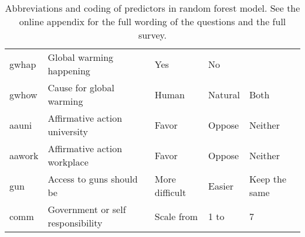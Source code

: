 \begin{table}[ht]
\begin{tabular}{lllll}
gwhap     & Global warming happening                   & Yes                                    & No            &               \\
gwhow     & Cause for global warming                   & Human                                  & Natural       & Both          \\
aauni     & Affirmative action university              & Favor                                  & Oppose        & Neither       \\
aawork    & Affirmative action workplace               & Favor                                  & Oppose        & Neither       \\
gun       & Access to guns should be                   & More difficult                         & Easier        & Keep the same \\
comm      & Government or self responsibility          & Scale from   							&  1        to  &   7           \\
\hline
\end{tabular}
\caption{Abbreviations and coding of predictors in random forest model. See the online appendix for the full wording of the questions and the full survey.}
\end{table}